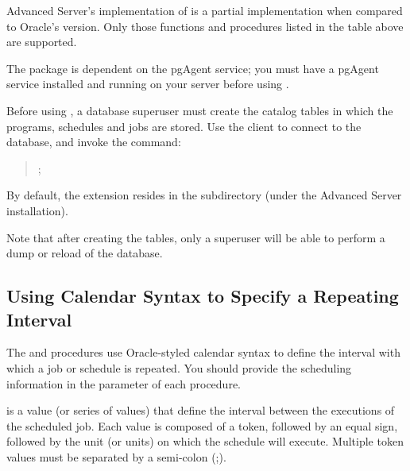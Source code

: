 \documentclass[letterpaper,10pt,english,openany,oneside]{sphinxmanual}
\begin{document}
Advanced Server’s implementation of  is a partial
implementation when compared to Oracle’s version. Only those functions
and procedures listed in the table above are supported.

The  package is dependent on the pgAgent service; you
must have a pgAgent service installed and running on your server before
using .

Before using , a database superuser must create the
catalog tables in which the  programs, schedules and jobs
are stored. Use the  client to connect to the database, and invoke
the command:
\begin{quote}

;
\end{quote}

By default, the  extension resides in the
 subdirectory (under the Advanced Server
installation).

Note that after creating the  tables, only a superuser
will be able to perform a dump or reload of the database.

\newpage


\subsection{Using Calendar Syntax to Specify a Repeating Interval}
\label{\detokenize{using_calendar_syntax_to_specify_a_repeating_interval::doc}}\label{\detokenize{using_calendar_syntax_to_specify_a_repeating_interval:using-calendar-syntax-to-specify-a-repeating-interval}}
The  and  procedures use Oracle-styled
calendar syntax to define the interval with which a job or schedule is
repeated. You should provide the scheduling information in the
 parameter of each procedure.

 is a value (or series of values) that define the
interval between the executions of the scheduled job. Each value is
composed of a token, followed by an equal sign, followed by the unit (or
units) on which the schedule will execute. Multiple token values must be
separated by a semi-colon (;).
\end{document}
